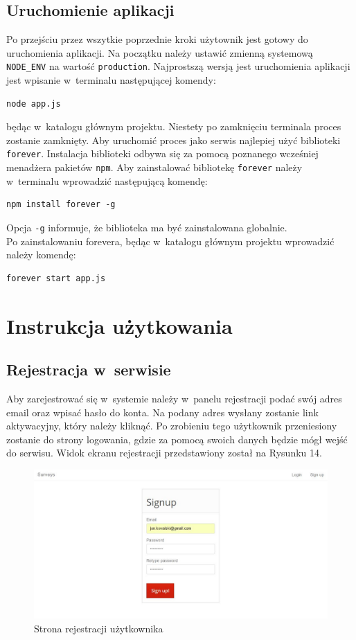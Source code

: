 \documentclass[12pt,a4paper,notitlepage]{article}
\begin{document}
\subsection{Uruchomienie aplikacji}
Po przejściu przez wszytkie poprzednie kroki użytownik jest gotowy do uruchomienia aplikacji. Na początku należy ustawić zmienną systemową \texttt{NODE\_ENV} na wartość \texttt{production}. Najprostszą wersją jest uruchomienia aplikacji jest wpisanie w~terminalu następującej komendy:
\begin{lstlisting}
node app.js
\end{lstlisting}
będąc w~katalogu głównym projektu. Niestety po zamknięciu terminala proces zostanie zamknięty. Aby uruchomić proces jako serwis najlepiej użyć biblioteki \texttt{forever}. Instalacja biblioteki odbywa się za pomocą poznanego wcześniej menadżera pakietów \texttt{npm}. Aby zainstalować bibliotekę \texttt{forever} należy w~terminalu wprowadzić następującą komendę:
\begin{lstlisting}
npm install forever -g
\end{lstlisting}
Opcja \texttt{-g} informuje, że biblioteka ma być zainstalowana globalnie. 
\\
Po zainstalowaniu forevera, będąc w~katalogu głównym projektu wprowadzić należy komendę:
\begin{lstlisting}
forever start app.js
\end{lstlisting}

\newpage
\section{Instrukcja użytkowania}
\subsection{Rejestracja w~serwisie}
Aby zarejestrować się w~systemie należy w~panelu rejestracji podać swój adres email oraz wpisać hasło do konta. Na podany adres wysłany zostanie link aktywacyjny, który należy kliknąć. Po zrobieniu tego użytkownik przeniesiony zostanie do strony logowania, gdzie za pomocą swoich danych będzie mógł wejść do serwisu. Widok ekranu rejestracji przedstawiony został na Rysunku 14.

\begin{figure}[H]
    \centering
    \includegraphics[width=\linewidth]{obrazy/register}
    \caption{Strona rejestracji użytkownika}
\end{figure} 
\end{document}
